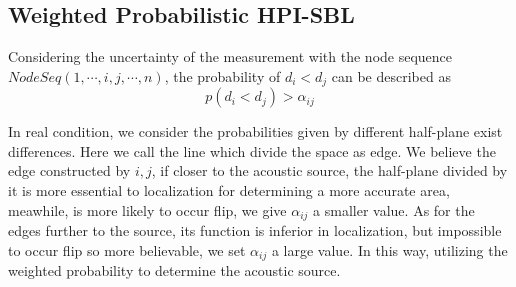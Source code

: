 \subsection{Weighted Probabilistic HPI-SBL}

 Considering the uncertainty of the measurement with the node sequence $NodeSeq( 1,\cdots ,i,j, \cdots,n )$, the probability of ${d_i} < {d_j}$ can be described as  
 \begin{equation}\label{eq1}
 p({d_i} < {d_j})>\alpha_{ij}
 \end{equation}

 In real condition, we consider the probabilities given by different half-plane exist differences. Here we call the line which divide the space as edge. We believe the edge constructed by $i,j$, if closer to the acoustic source, the half-plane divided by it is more essential to localization for determining a more accurate area, meawhile, is more likely to occur flip, we give $\alpha_{ij}$ a smaller value. As for the edges further to the source, its function is inferior in localization, but impossible to occur flip so more believable, we set $\alpha_{ij}$ a large value. In this way, utilizing the weighted probability to determine the acoustic source.
 
